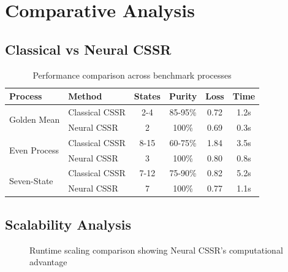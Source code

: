\documentclass[11pt,a4paper]{report}
\theoremstyle{definition}
\begin{document}
\section{Comparative Analysis}
\label{sec:comparative}

\subsection{Classical vs Neural CSSR}

\begin{table}[htbp]
\centering
\caption{Performance comparison across benchmark processes}
\label{tab:comparison}
\begin{tabular}{@{}llcccc@{}}
\toprule
\textbf{Process} & \textbf{Method} & \textbf{States} & \textbf{Purity} & \textbf{Loss} & \textbf{Time} \\
\midrule
\multirow{2}{*}{Golden Mean} 
& Classical CSSR & 2-4 & 85-95\% & 0.72 & 1.2s \\
& Neural CSSR & \cellcolor{highlightgreen}2 & \cellcolor{highlightgreen}100\% & \cellcolor{highlightgreen}0.69 & 0.3s \\
\midrule
\multirow{2}{*}{Even Process} 
& Classical CSSR & 8-15 & 60-75\% & 1.84 & 3.5s \\
& Neural CSSR & \cellcolor{highlightgreen}3 & \cellcolor{highlightgreen}100\% & \cellcolor{highlightgreen}0.80 & 0.8s \\
\midrule
\multirow{2}{*}{Seven-State} 
& Classical CSSR & 7-12 & 75-90\% & 0.82 & 5.2s \\
& Neural CSSR & \cellcolor{highlightgreen}7 & \cellcolor{highlightgreen}100\% & \cellcolor{highlightgreen}0.77 & 1.1s \\
\bottomrule
\end{tabular}
\end{table}

\subsection{Scalability Analysis}

\begin{figure}[htbp]
\centering
{}
\caption{Runtime scaling comparison showing Neural CSSR's computational advantage}
\label{fig:scalability}
\end{figure}
\end{document}
